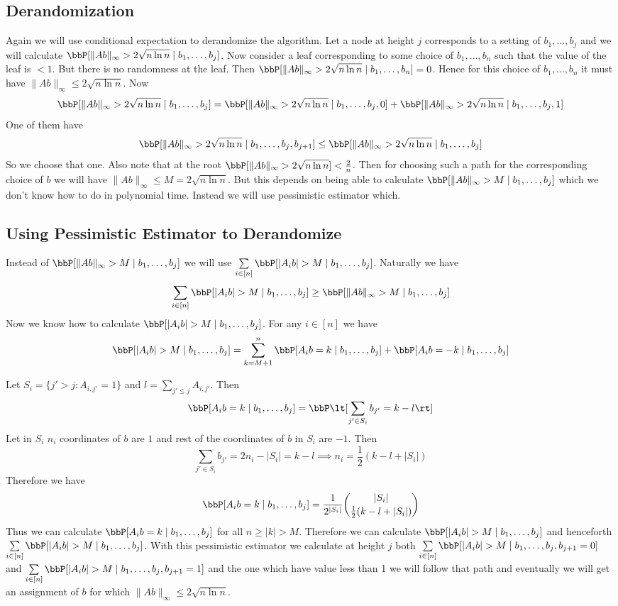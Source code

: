 \subsection{Derandomization}
Again we will use conditional expectation to derandomize the algorithm. Let a node at height $j$ corresponds to a setting of $b_1, \dots, b_j$ and we will calculate $\bbP[\|Ab\|_{\infty}>2\sqrt{n\ln n}\mid b_1,\dots, b_j]$. Now consider a leaf corresponding to some choice of $b_1,\dots, b_n$ such that the value of the leaf is $<1$.  But there is no randomness at the leaf. Then $\bbP[\|Ab\|_{\infty}>2\sqrt{n\ln n}\mid b_1,\dots, b_n]=0$. Hence for this choice of $b_1,\dots, b_n$ it must have $\|Ab\|_{\infty} \leq 2\sqrt{n\ln  n}$. Now $$\bbP[\|Ab\|_{\infty}>2\sqrt{n\ln n}\mid b_1,\dots, b_j]=\bbP[\|Ab\|_{\infty}>2\sqrt{n\ln n}\mid b_1,\dots, b_j,0]+\bbP[\|Ab\|_{\infty}>2\sqrt{n\ln n}\mid b_1,\dots, b_j,1]$$One of them have $$\bbP[\|Ab\|_{\infty}>2\sqrt{n\ln n}\mid b_1,\dots, b_j,b_{j+1}]\leq \bbP[\|Ab\|_{\infty}>2\sqrt{n\ln n}\mid b_1,\dots, b_j]$$So we choose that one. Also note that at the root $\bbP[\|Ab\|_{\infty}>2\sqrt{n\ln n}]<\frac2n$. Then for choosing such a path for the corresponding choice of $b$ we will have $\|Ab\|_{\infty}\leq M=2\sqrt{n\ln n}$. But this depends on being able to calculate $\bbP[\|Ab\|_{\infty}>M\mid b_1,\dots, b_j]$ which we don't know how to do in polynomial time. Instead we will use pessimistic estimator which.
\subsection{Using Pessimistic Estimator to Derandomize}
Instead of $\bbP[\|Ab\|_{\infty}>M\mid b_1,\dots, b_j]$ we will use $\sum\limits_{i\in [n]}\bbP[|A_ib|>M\mid b_1,\dots, b_j]$. Naturally we have $$\sum\limits_{i\in [n]}\bbP[|A_ib|>M\mid b_1,\dots, b_j]\geq \bbP[\|Ab\|_{\infty}>M\mid b_1,\dots, b_j]$$Now we know how to calculate $\bbP[|A_ib|>M\mid b_1,\dots, b_j]$. For any $i\in [n]$ we have $$\bbP[|A_ib|>M\mid b_1,\dots, b_j]=\sum_{k=M+1}^n \bbP[A_ib=k\mid b_1,\dots, b_j]+\bbP[A_ib=-k\mid b_1,\dots, b_j]$$

Let $S_i=\{j'>j\colon A_{i,j'}=1\}$ and $l=\sum\limits_{j'\leq j}A_{i,j'}$. Then $$ \bbP[A_ib=k\mid b_1,\dots, b_j]=  \bbP\lt[\sum\limits_{j'\in S_i}b_{j'}=k-l\rt]$$Let in $S_i$ $n_i$ coordinates of $b$ are $1$ and rest of the coordinates of $b$ in $S_i$ are $-1$. Then $$\sum_{j'\in S_i}b_{j'}=2n_i-|S_i|=k-l\implies n_i=\frac12(k-l+|S_i|)$$Therefore we have $$\bbP[A_ib=k\mid b_1,\dots, b_j]=\frac1{2^{|S_i|}}\binom{|S_i|}{\frac12(k-l+|S_i|)}$$Thus we can calculate $\bbP[A_ib=k\mid b_1,\dots, b_j]$ for all $n\geq |k|>M$. Therefore we can calculate $\bbP[|A_ib|>M\mid b_1,\dots, b_j]$ and henceforth $\sum\limits_{i\in [n]}\bbP[|A_ib|>M\mid b_1,\dots, b_j]$. With this pessimistic estimator we calculate at height $j$ both $\sum\limits_{i\in [n]}\bbP[|A_ib|>M\mid b_1,\dots, b_j,b_{j+1}=0] $ and $\sum\limits_{i\in [n]}\bbP[|A_ib|>M\mid b_1,\dots, b_j,b_{j+1}=1]$ and the one which have value less than 1 we will follow that path and eventually we will get an assignment of $b$ for which $\|Ab\|_{\infty}\leq 2\sqrt{n\ln n}$. 


